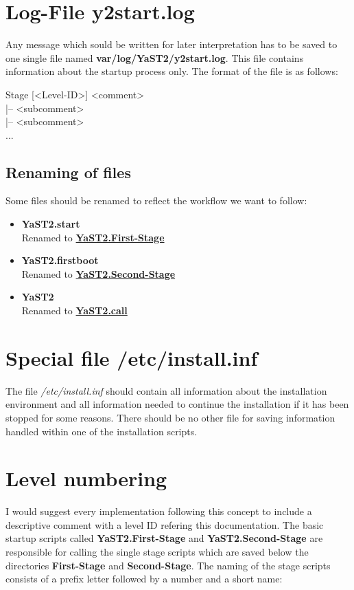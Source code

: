 \section{Log-File y2start.log}
Any message which sould be written for later interpretation has to
be saved to one single file named \textbf{var/log/YaST2/y2start.log}.
This file contains information about the startup process only.
The format of the file is as follows:

\begin{Command}{12cm}
Stage [<Level-ID>] <comment>\\
\hspace*{3cm} |-- <subcomment>\\
\hspace*{3cm} |-- <subcomment>\\
...
\end{Command}

\subsection{Renaming of files}
Some files should be renamed to reflect the workflow we want to
follow:
\begin{itemize}
\item \textbf{YaST2.start}\\
      Renamed to \underline{\textbf{YaST2.First-Stage}}
\item \textbf{YaST2.firstboot}\\
      Renamed to \underline{\textbf{YaST2.Second-Stage}}
\item \textbf{YaST2}\\
      Renamed to \underline{\textbf{YaST2.call}}
\end{itemize}

\section{Special file \textbf{/etc/install.inf}}
The file \textit{/etc/install.inf} should contain all information
about the installation environment and all information needed to
continue the installation if it has been stopped for some reasons.
There should be no other file for saving information handled
within one of the installation scripts.

\section{Level numbering}
I would suggest every implementation following this concept to include
a descriptive comment with a level ID refering this documentation.
The basic startup scripts called \textbf{YaST2.First-Stage} and
\textbf{YaST2.Second-Stage} are responsible for calling the single stage
scripts which are saved below the directories \textbf{First-Stage} and
\textbf{Second-Stage}. The naming of the stage scripts consists of a prefix
letter followed by a number and a short name:

